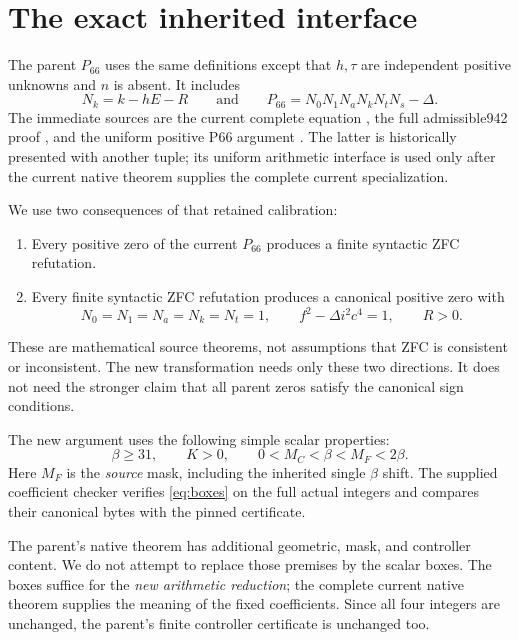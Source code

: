 \documentclass[11pt,letterpaper]{article}
\theoremstyle{definition}
\begin{document}
\section{The exact inherited interface}\label{sec:interface}

The parent \(P_{66}\) uses the same definitions except that \(h,\tau\) are
independent positive unknowns and \(n\) is absent. It includes
\[
 N_k=k-hE-R
 \qquad\text{and}\qquad
 P_{66}=N_0N_1N_aN_kN_tN_s-\Delta.
\]
The immediate sources are the current complete equation
\cite{current}, the full admissible942 proof \cite{native}, and the uniform
positive P66 argument \cite{P66}. The latter is historically presented
with another tuple; its uniform arithmetic interface is used only after
the current native theorem supplies the complete current specialization.

We use two consequences of that retained calibration:
\begin{enumerate}[label=(\roman*),leftmargin=2em]
 \item Every positive zero of the current \(P_{66}\) produces a finite
 syntactic ZFC refutation.
 \item Every finite syntactic ZFC refutation produces a canonical positive
 zero with
 \[
 N_0=N_1=N_a=N_k=N_t=1,\qquad
 f^2-\Delta i^2c^4=1,\qquad R>0.
 \]
\end{enumerate}
These are mathematical source theorems, not assumptions that ZFC is
consistent or inconsistent. The new transformation needs only these
two directions. It does not need the stronger claim that all parent
zeros satisfy the canonical sign conditions.

The new argument uses the following simple scalar properties:
\begin{equation}\label{eq:boxes}
 \beta\ge31,\qquad K>0,\qquad 0<M_C<\beta<M_F<2\beta.
\end{equation}
Here \(M_F\) is the \emph{source} mask, including the inherited single
\(\beta\) shift. The supplied coefficient checker verifies
\eqref{eq:boxes} on the full actual integers and compares their canonical
bytes with the pinned certificate.

The parent's native theorem has additional geometric, mask, and controller
content. We do not attempt to replace those premises by the scalar boxes.
The boxes suffice for the \emph{new arithmetic reduction}; the complete
current native theorem supplies the meaning of the fixed coefficients.
Since all four integers are unchanged, the parent's finite controller
certificate is unchanged too.
\end{document}
